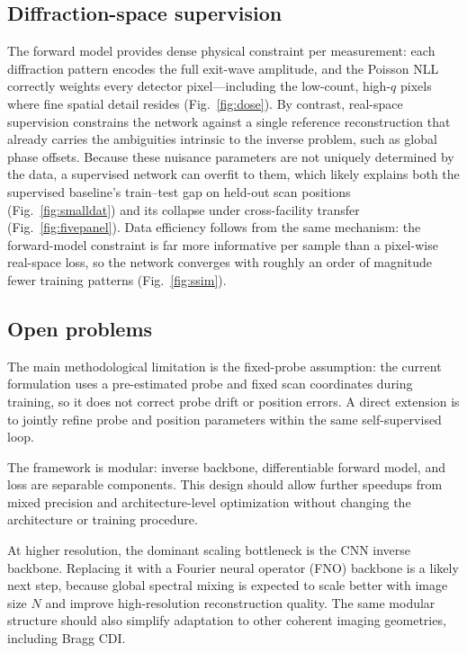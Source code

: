 \documentclass{optica-article}
\begin{document}
\subsection*{Diffraction-space supervision}
The forward model provides dense physical constraint per measurement: each diffraction pattern encodes the full exit-wave amplitude, and the Poisson NLL correctly weights every detector pixel---including the low-count, high-$q$ pixels where fine spatial detail resides (Fig.~\ref{fig:dose}). By contrast, real-space supervision constrains the network against a single reference reconstruction that already carries the ambiguities intrinsic to the inverse problem, such as global phase offsets. Because these nuisance parameters are not uniquely determined by the data, a supervised network can overfit to them, which likely explains both the supervised baseline's train--test gap on held-out scan positions (Fig.~\ref{fig:smalldat}) and its collapse under cross-facility transfer (Fig.~\ref{fig:fivepanel}). Data efficiency follows from the same mechanism: the forward-model constraint is far more informative per sample than a pixel-wise real-space loss, so the network converges with roughly an order of magnitude fewer training patterns (Fig.~\ref{fig:ssim}).

\subsection*{Open problems}
The main methodological limitation is the fixed-probe assumption: the current formulation uses a pre-estimated probe and fixed scan coordinates during training, so it does not correct probe drift or position errors. A direct extension is to jointly refine probe and position parameters within the same self-supervised loop.

The framework is modular: inverse backbone, differentiable forward model, and loss are separable components. This design should allow further speedups from mixed precision and architecture-level optimization without changing the architecture or training procedure.

At higher resolution, the dominant scaling bottleneck is the CNN inverse backbone. Replacing it with a Fourier neural operator (FNO) backbone is a likely next step, because global spectral mixing is expected to scale better with image size $N$ and improve high-resolution reconstruction quality. The same modular structure should also simplify adaptation to other coherent imaging geometries, including Bragg CDI.
\end{document}
